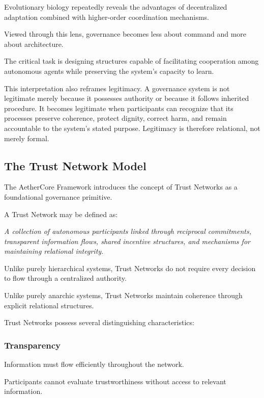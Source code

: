 \documentclass[12pt]{article}
\begin{document}
Evolutionary biology repeatedly reveals the advantages of decentralized adaptation combined with higher-order coordination mechanisms.

Viewed through this lens, governance becomes less about command and more about architecture.

The critical task is designing structures capable of facilitating cooperation among autonomous agents while preserving the system's capacity to learn.

This interpretation also reframes legitimacy. A governance system is not legitimate merely because it possesses authority or because it follows inherited procedure. It becomes legitimate when participants can recognize that its processes preserve coherence, protect dignity, correct harm, and remain accountable to the system's stated purpose. Legitimacy is therefore relational, not merely formal.

\subsection{The Trust Network Model}

The AetherCore Framework introduces the concept of Trust Networks as a foundational governance primitive.

A Trust Network may be defined as:

\begin{center}
\textit{A collection of autonomous participants linked through reciprocal commitments, transparent information flows, shared incentive structures, and mechanisms for maintaining relational integrity.}
\end{center}

Unlike purely hierarchical systems, Trust Networks do not require every decision to flow through a centralized authority.

Unlike purely anarchic systems, Trust Networks maintain coherence through explicit relational structures.

Trust Networks possess several distinguishing characteristics:

\subsubsection*{Transparency}

Information must flow efficiently throughout the network.

Participants cannot evaluate trustworthiness without access to relevant information.
\end{document}
